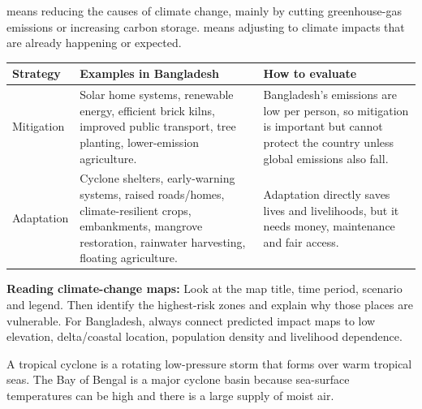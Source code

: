 \documentclass[11pt,a4paper]{article}
\begin{document}
 means reducing the causes of climate change, mainly by cutting greenhouse-gas emissions or increasing carbon storage.  means adjusting to climate impacts that are already happening or expected.

\begin{tabularx}{\textwidth}{p{2.9cm}Y Y}
\toprule
\textbf{Strategy} & \textbf{Examples in Bangladesh} & \textbf{How to evaluate}\\
\midrule
Mitigation & Solar home systems, renewable energy, efficient brick kilns, improved public transport, tree planting, lower-emission agriculture. & Bangladesh's emissions are low per person, so mitigation is important but cannot protect the country unless global emissions also fall.\\
Adaptation & Cyclone shelters, early-warning systems, raised roads/homes, climate-resilient crops, embankments, mangrove restoration, rainwater harvesting, floating agriculture. & Adaptation directly saves lives and livelihoods, but it needs money, maintenance and fair access.\\
\bottomrule
\end{tabularx}

\begin{skillbox}
\textbf{Reading climate-change maps:} Look at the map title, time period, scenario and legend. Then identify the highest-risk zones and explain why those places are vulnerable. For Bangladesh, always connect predicted impact maps to low elevation, delta/coastal location, population density and livelihood dependence.
\end{skillbox}

\newpage
{}

A tropical cyclone is a rotating low-pressure storm that forms over warm tropical seas. The Bay of Bengal is a major cyclone basin because sea-surface temperatures can be high and there is a large supply of moist air.

\begin{center}
\end{center}
\end{document}
